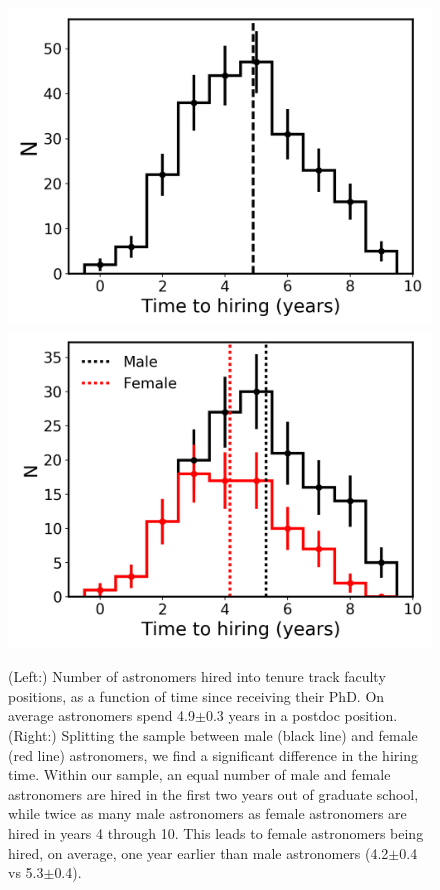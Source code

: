 \documentclass[modern]{aastex62}
\begin{document}
\begin{figure}[!htb]
\center
\includegraphics[scale=.46]{full_hiring_time.png}
\includegraphics[scale=.46]{gender_hiring_time.png}
\caption{(Left:) Number of astronomers hired into tenure track faculty positions, as a function of time since receiving their PhD. On average astronomers spend 4.9$\pm$0.3 years in a postdoc position. 
(Right:) Splitting the sample between male (black line) and female (red line) astronomers, we find a significant difference in the hiring time. Within our sample, an equal number of male and female astronomers are hired in the first two years out of graduate school, while twice as many male astronomers as female astronomers are hired in years 4 through 10. This leads to female astronomers being hired, on average, one year earlier than male astronomers (4.2$\pm$0.4 vs 5.3$\pm$0.4).\label{hiring_time}}
\end{figure}
\end{document}
